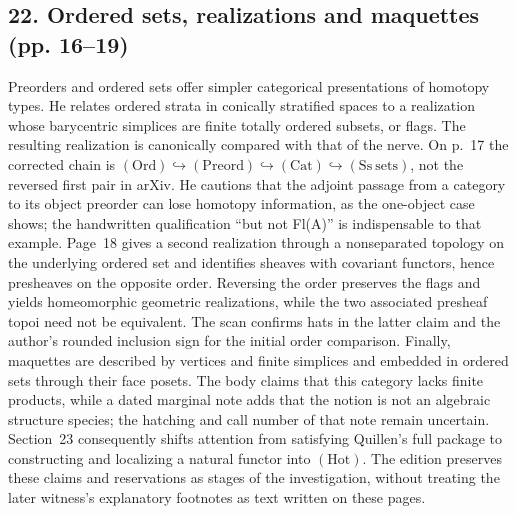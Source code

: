 \documentclass[10pt,oneside]{book}
\begin{document}
\subsection*{22. Ordered sets, realizations and maquettes (pp. 16--19)}
Preorders and ordered sets offer simpler categorical presentations of homotopy types. He relates ordered strata in conically stratified spaces to a realization whose barycentric simplices are finite totally ordered subsets, or flags. The resulting realization is canonically compared with that of the nerve. On p.~17 the corrected chain is $(\mathrm{Ord})\hookrightarrow(\mathrm{Preord})\hookrightarrow(\mathrm{Cat})\hookrightarrow(\mathrm{Ss\ sets})$, not the reversed first pair in arXiv. He cautions that the adjoint passage from a category to its object preorder can lose homotopy information, as the one-object case shows; the handwritten qualification ``but not Fl(A)'' is indispensable to that example. Page~18 gives a second realization through a nonseparated topology on the underlying ordered set and identifies sheaves with covariant functors, hence presheaves on the opposite order. Reversing the order preserves the flags and yields homeomorphic geometric realizations, while the two associated presheaf topoi need not be equivalent. The scan confirms hats in the latter claim and the author's rounded inclusion sign for the initial order comparison. Finally, maquettes are described by vertices and finite simplices and embedded in ordered sets through their face posets. The body claims that this category lacks finite products, while a dated marginal note adds that the notion is not an algebraic structure species; the hatching and call number of that note remain uncertain. Section~23 consequently shifts attention from satisfying Quillen's full package to constructing and localizing a natural functor into $(\mathrm{Hot})$. The edition preserves these claims and reservations as stages of the investigation, without treating the later witness's explanatory footnotes as text written on these pages.
\end{document}
